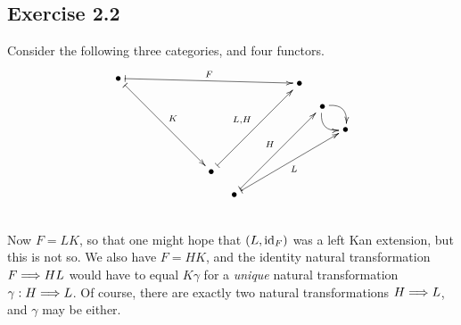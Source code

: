 \documentclass[11pt]{article}
\begin{document}
\begin{solutions}
\subsection*{Exercise 2.2}
Consider the following three categories, and four functors.
\[\xymatrix@R=.4cm@C=3cm@ur{
\bullet\ar@{|->}[ddddd]^K\ar@{|->}[dddrdd]^F
\\\\\\
\\
\\
\bullet\ar@{|->}[r]^-{L,H}&%
\bullet\\%
\bullet\ar@{|->}[r]^-{H}\ar@{|->}[dr]_-{L}&%
\bullet\ar@/^1em/[d]\ar@/_1em/[d]\\%
&%
\bullet
}\]
Now $F=LK$, so that one might hope that $(L,\textup{id}_F)$ was a left Kan extension, but this is not so. We also have $F=HK$, and the identity natural transformation $F\Longrightarrow HL$ would have to equal $K\gamma$ for a \emph{unique} natural transformation $\gamma:H\Longrightarrow L$. Of course, there are exactly two natural transformations $H\Longrightarrow L$, and $\gamma$ may be either.

\end{solutions}
\end{document}
